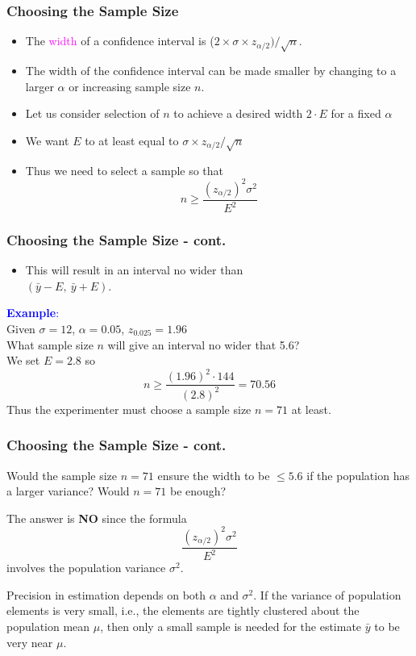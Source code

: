 \documentclass[xcolor=dvipsnames,12pt]{beamer}
\begin{document}
\begin{frame}
\frametitle{Choosing the Sample Size}
\begin{itemize}
\item  The \textcolor{magenta}{width} of a confidence interval is
($2 \times \sigma \times z_{\alpha/2})/\sqrt{n}$.  
\item The width of the confidence interval can be made smaller by changing to a larger $\alpha$ or 
increasing sample size $n$.  
\item Let us consider selection of $n$ to achieve a desired 
width $2 \cdot E$ for a fixed $\alpha$
\item We want $E$ to at least equal to  $\sigma \times z_{\alpha/2}/\sqrt{n}$
\item Thus we need to select a sample so that
$$
 n \geq \frac{(z_{\alpha/2})^2\sigma^2}{E^2}
$$
\end{itemize}
\end{frame}



\begin{frame}
\frametitle{Choosing the Sample Size - cont.}
\begin{itemize}
\item  This  will result in an interval no wider than\\
$(\bar{y} - E,\ \bar{y} + E)$.
\end{itemize}
\textcolor{blue}{\textbf{Example}:}\\
Given $\sigma = 12$, $\alpha = 0.05$, $z_{0.025} = 1.96$\\[.1in]
 What sample size  $n$ will give an interval no wider that 5.6? \\
We set  $E = 2.8$ so
$$
  n \geq \frac{(1.96)^2 \cdot 144}{(2.8)^2} = 70.56
$$
Thus the experimenter must choose a sample size $n = 71$ at least.
\end{frame}


\begin{frame}
\frametitle{Choosing the Sample Size - cont.}
 Would the sample size $n = 71$ ensure the width to be $
\leq 5.6$ if the population has a larger variance?
Would $n = 71$ be enough?

 The answer is {\bf NO} since the formula
$$
   \frac{(z_{\alpha/2})^2\sigma^2}{E^2}
$$
involves the population variance $\sigma^2$.

 Precision in estimation depends on both $\alpha$ and $\sigma^2$.  If the
variance of population elements is very small, i.e., the elements
are tightly clustered about the population mean $\mu$, then only a
small sample is needed for the estimate $\bar{y}$ to be very near $\mu$.
\end{frame}
\end{document}
